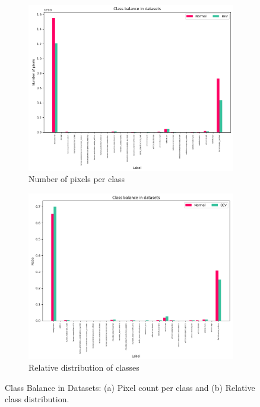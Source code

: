 \begin{figure}[!ht]
    \centering
    \begin{subfigure}[b]{0.48\textwidth}
        \centering
        \includegraphics[width=\linewidth]{images/appendix/dataset_class_balance_pixels.png}
        \caption{Number of pixels per class}
        \label{fig:dataset_class_balance_pixels}
    \end{subfigure}
    \hfill
    \begin{subfigure}[b]{0.48\textwidth}
        \centering
        \includegraphics[width=\linewidth]{images/appendix/dataset_class_balance_ratio.png}
        \caption{Relative distribution of classes}
        \label{fig:dataset_class_balance_ratio}
    \end{subfigure}
    \caption{Class Balance in Datasets: (a) Pixel count per class and (b) Relative class distribution.}
    \label{fig:dataset_class_balance_combined}
\end{figure}

